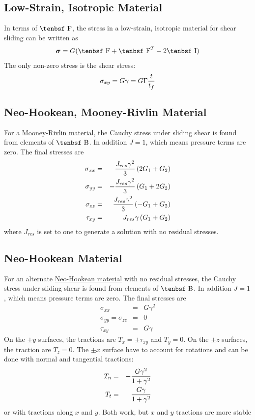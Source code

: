 \documentclass[11pt]{book}
\newcommand{\tens}[1]{\boldsymbol{\mathsf{#1}}}
\def\B{\hbox{\tenbsf B}}
\def\F{\hbox{\tenbsf F}}
\def\I{\hbox{\tenbsf I}}
\def\Jres{J_{res}}
\begin{document}
\subsection{Low-Strain, Isotropic Material}

In terms of $\F$, the stress in a low-strain, isotropic material for shear sliding can be written as
\begin{equation}
    \tens{\sigma} = G(\F + \F^T -2\I)
\end{equation}
The only non-zero stress is the shear stress:
\begin{equation}
    \sigma_{xy} = G\gamma = G\Gamma{t\over t_f}
\end{equation}

\subsection{Neo-Hookean, Mooney-Rivlin Material}

For a  \hyperref[MRM]{Mooney-Rivlin material}, the Cauchy stress under sliding shear is found from elements of $\B$. In addition $J=1$, which means pressure terms are zero. The final stresses are
\begin{eqnarray}
     \sigma_{xx} & = & {\Jres\gamma^2\over 3} \left( 2G_1 + G_2 \right) \\
     \sigma_{yy} & = & -{\Jres\gamma^2\over 3} \left( G_1 + 2G_2 \right) \\
     \sigma_{zz} & = & {\Jres\gamma^2\over 3} \left( -G_1 + G_2 \right) \\
     \tau_{xy} & = & \Jres\gamma \left( G_1 + G_2 \right)
\end{eqnarray}
where $\Jres$ is set to one to generate a solution with no residual stresses.

\subsection{Neo-Hookean Material}

For an alternate \hyperref[NHM]{Neo-Hookean material} with no residual stresses, the Cauchy stress under sliding shear is found from elements of $\B$. In addition $J=1$, which means pressure terms are zero. The final stresses are
\begin{eqnarray}
      \sigma_{xx} & = & G\gamma^2  \\
      \sigma_{yy} = \sigma_{zz} & = & 0  \\
      \tau_{xy} & = & G\gamma
\end{eqnarray}
On the $\pm y$ surfaces, the tractions are $T_x = \pm\tau_{xy}$ and $T_y = 0$. On the $\pm z$ surfaces, the traction are $T_z=0$. The $\pm x$ surface have to account for rotations and can be done with normal and tangential tractions:
\begin{eqnarray}
     T_n & = & -{G\gamma^2\over 1+\gamma^2} \\
     T_t & = & {G\gamma\over 1+ \gamma^2} 
\end{eqnarray}
or with tractions along $x$ and $y$. Both work, but $x$ and $y$ tractions are more stable
\end{document}
